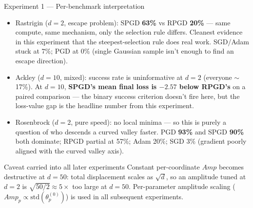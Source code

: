 \documentclass[11pt,aspectratio=169]{beamer}
\newcommand{\amp}{\ensuremath{\textit{Amp}}}
\begin{document}
\begin{frame}{Experiment 1 --- Per-benchmark interpretation}
  \footnotesize
  \begin{itemize}\setlength\itemsep{0.4em}
    \item \alert{Rastrigin ($d{=}2$, escape problem):}
          SPGD \textbf{63\%} vs RPGD \textbf{20\%} --- same compute, same
          mechanism, only the selection rule differs. \alert{Cleanest
          evidence in this experiment that the steepest-selection rule
          does real work.} SGD/Adam stuck at 7\%; PGD at 0\% (single
          Gaussian sample isn't enough to find an escape direction).
    \item \alert{Ackley ($d{=}10$, mixed):} success rate is uninformative
          at $d{=}2$ (everyone $\sim$17\%). At $d{=}10$, \textbf{SPGD's
          mean final loss is $-2.57$ below RPGD's} on a paired comparison
          --- the binary success criterion doesn't fire here, but the
          loss-value gap is the headline number from this experiment.
    \item \alert{Rosenbrock ($d{=}2$, pure speed):} no local minima --- so
          this is purely a question of who descends a curved valley
          faster. PGD \textbf{93\%} and SPGD \textbf{90\%} both dominate;
          RPGD partial at 57\%; Adam 20\%; SGD 3\% (gradient
          poorly aligned with the curved valley axis).
  \end{itemize}
  \vspace{0.5em}
  \begin{block}{Caveat carried into all later experiments}
    Constant per-coordinate \amp{} becomes destructive at $d{=}50$:
    total displacement scales as $\sqrt{d}$, so an amplitude tuned at
    $d{=}2$ is $\sqrt{50/2}\!\approx\!5\times$ too large at $d{=}50$.
    \alert{Per-parameter amplitude scaling}
    ($\amp_p \propto \mathrm{std}(\theta_p^{(0)})$) is used in all
    subsequent experiments.
  \end{block}
\end{frame}
\end{document}

